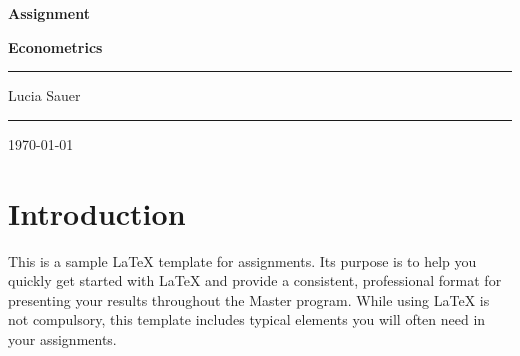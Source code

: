 \documentclass[12pt,a4paper]{article}
\begin{document}
\begin{titlepage}
\centering

\par\vspace{0.75cm}
	{\huge\bfseries Assignment~\nass\par}
    {\large\bfseries Econometrics\par}
	\vspace{0.25cm}
    \noindent\rule{\textwidth}{1pt}
    {\Large Lucia Sauer \par}
    \noindent\rule{\textwidth}{1pt}
	\vfill
	{\large \today\par}
\end{titlepage}

\tableofcontents

\newpage

\section{Introduction}
This is a sample LaTeX template for assignments. Its purpose is to help you quickly get started with LaTeX and provide a consistent, professional format for presenting your results throughout the Master program. While using LaTeX is not compulsory, this template includes typical elements you will often need in your assignments.


\newpage

\newpage
 


\end{document}

